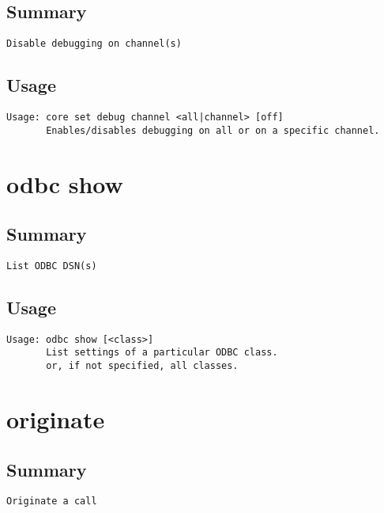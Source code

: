 \subsection{Summary}
\begin{verbatim}
Disable debugging on channel(s)
\end{verbatim}
\subsection{Usage}
\begin{verbatim}
Usage: core set debug channel <all|channel> [off]
       Enables/disables debugging on all or on a specific channel.

\end{verbatim}


\section{odbc show}
\subsection{Summary}
\begin{verbatim}
List ODBC DSN(s)
\end{verbatim}
\subsection{Usage}
\begin{verbatim}
Usage: odbc show [<class>]
       List settings of a particular ODBC class.
       or, if not specified, all classes.

\end{verbatim}


\section{originate}
\subsection{Summary}
\begin{verbatim}
Originate a call
\end{verbatim}
